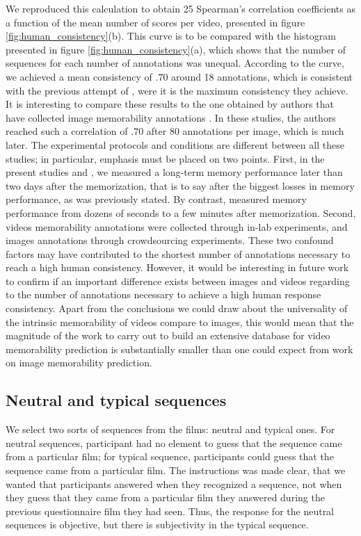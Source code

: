\documentclass[sigconf]{acmart}
\begin{document}
We reproduced this calculation to obtain 25 Spearman's correlation coefficients as a function of the mean number of scores per video, presented in figure \ref{fig:human_consistency}(b).
This curve is to be compared with the histogram presented in figure \ref{fig:human_consistency}(a), which shows that the number of sequences for each number of annotations was unequal.
According to the curve, we achieved a mean consistency of $.70$ around 18 annotations, which is consistent with the previous attempt of \cite{han_2015_learning}, were it is the maximum consistency they achieve.
It is interesting to compare these results to the one obtained by authors that have collected image memorability annotations \cite{isola_2011_makes,khosla_2015_understanding}.
In these studies, the authors reached such a correlation of $.70$ after 80 annotations per image, which is much later.
The experimental protocols and conditions are different between all these studies; in particular, emphasis must be placed on two points.
First, in the present studies and \cite{han_2015_learning}, we measured a long-term memory performance later than two days after the memorization, that is to say after the biggest losses in memory performance, as was previously stated. By contrast, \cite{isola_2011_makes,khosla_2015_understanding} measured memory performance from dozens of seconds to a few minutes after memorization. 
Second, videos memorability annotations were collected through in-lab experiments, and images annotations through crowdsourcing experiments.
These two confound factors may have contributed to the shortest number of annotations necessary to reach a high human consistency.
However, it would be interesting in future work to confirm if an important difference exists between images and videos regarding to the number of annotations necessary to achieve a high human response consistency.
Apart from the conclusions we could draw about the universality of the intrinsic memorability of videos compare to images, this would mean that the magnitude of the work to carry out to build an extensive database for video memorability prediction is substantially smaller than one could expect from work on image memorability prediction.

\subsection{Neutral and typical sequences}
We select two sorts of sequences from the films: neutral and typical ones.
For neutral sequences, participant had no element to guess that the sequence came from a particular film; for typical sequence, participants could guess that the sequence came from a particular film.
The instructions was made clear, that we wanted that participants answered when they recognized a sequence, not when they guess that they came from a particular film they answered during the previous questionnaire film they had seen.
Thus, the response for the neutral sequences is objective, but there is subjectivity in the typical sequence.
\end{document}
